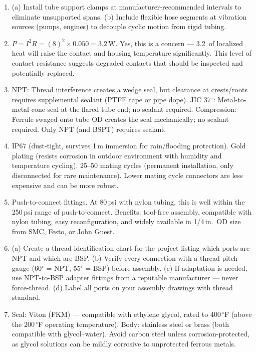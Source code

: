 \documentclass[11pt,letterpaper,twoside,openany]{book}
\providecommand{\ang}[1]{#1\ensuremath{{}^{\circ}}}
\begin{document}
\begin{enumerate}[leftmargin=1.5em]
  \item (a) Install tube support clamps at manufacturer-recommended intervals to eliminate unsupported spans. (b) Include flexible hose segments at vibration sources (pumps, engines) to decouple cyclic motion from rigid tubing.

  \item $P = I^2R = (8)^2 \times 0.050 = 3.2\,\text{W}$. Yes, this is a concern --- 3.2\, of localized heat will raise the contact and housing temperature significantly. This level of contact resistance suggests degraded contacts that should be inspected and potentially replaced.

  \item NPT: Thread interference creates a wedge seal, but clearance at crests/roots requires supplemental sealant (PTFE tape or pipe dope). JIC 37$^{\circ}$: Metal-to-metal cone seal at the flared tube end; no sealant required. Compression: Ferrule swaged onto tube OD creates the seal mechanically; no sealant required. Only NPT (and BSPT) requires sealant.

  \item IP67 (dust-tight, survives 1\,m immersion for rain/flooding protection). Gold plating (resists corrosion in outdoor environment with humidity and temperature cycling). 25--50 mating cycles (permanent installation, only disconnected for rare maintenance). Lower mating cycle connectors are less expensive and can be more robust.

  \item Push-to-connect fittings. At 80\,psi with nylon tubing, this is well within the 250\,psi range of push-to-connect. Benefits: tool-free assembly, compatible with nylon tubing, easy reconfiguration, and widely available in 1/4\,in.\ OD size from SMC, Festo, or John Guest.

  \item (a) Create a thread identification chart for the project listing which ports are NPT and which are BSP. (b) Verify every connection with a thread pitch gauge (\ang{60} = NPT, \ang{55} = BSP) before assembly. (c) If adaptation is needed, use NPT-to-BSP adapter fittings from a reputable manufacturer --- never force-thread. (d) Label all ports on your assembly drawings with thread standard.

  \item Seal: Viton (FKM) --- compatible with ethylene glycol, rated to 400\,$^{\circ}$F (above the 200\,$^{\circ}$F operating temperature). Body: stainless steel or brass (both compatible with glycol--water). Avoid carbon steel unless corrosion-protected, as glycol solutions can be mildly corrosive to unprotected ferrous metals.


\end{enumerate}
\end{document}
